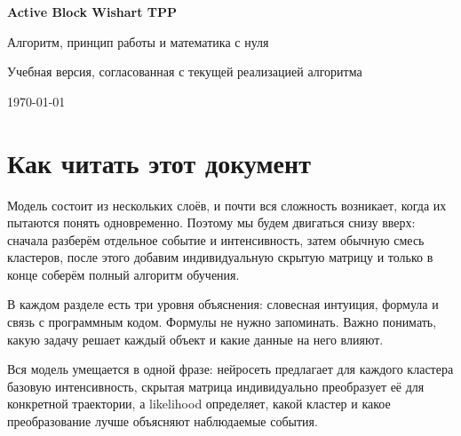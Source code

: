\documentclass[12pt,a4paper]{article}
\newenvironment{summarybox}{\par\medskip\noindent{\color{navy}\bfseries Короткий итог. }\ignorespaces}{\par\medskip}
\begin{document}
\begin{titlepage}
\centering
\vspace*{20mm}
{\sffamily\bfseries\color{navy}\fontsize{28}{34}\selectfont Active Block Wishart TPP\par}
\vspace{5mm}
{\sffamily\Large Алгоритм, принцип работы и математика с нуля\par}
\vspace{14mm}
\vfill
{\large Учебная версия, согласованная с текущей реализацией алгоритма\par}
\vspace{5mm}
{\large \today\par}
\end{titlepage}

\setcounter{tocdepth}{1}
\tableofcontents
\newpage

\section*{Как читать этот документ}

Модель состоит из нескольких слоёв, и почти вся сложность возникает, когда их пытаются понять одновременно. Поэтому мы будем двигаться снизу вверх: сначала разберём отдельное событие и интенсивность, затем обычную смесь кластеров, после этого добавим индивидуальную скрытую матрицу и только в конце соберём полный алгоритм обучения.

В каждом разделе есть три уровня объяснения: словесная интуиция, формула и связь с программным кодом. Формулы не нужно запоминать. Важно понимать, какую задачу решает каждый объект и какие данные на него влияют.

\begin{summarybox}
Вся модель умещается в одной фразе: нейросеть предлагает для каждого кластера базовую интенсивность, скрытая матрица индивидуально преобразует её для конкретной траектории, а likelihood определяет, какой кластер и какое преобразование лучше объясняют наблюдаемые события.
\end{summarybox}
\end{document}
